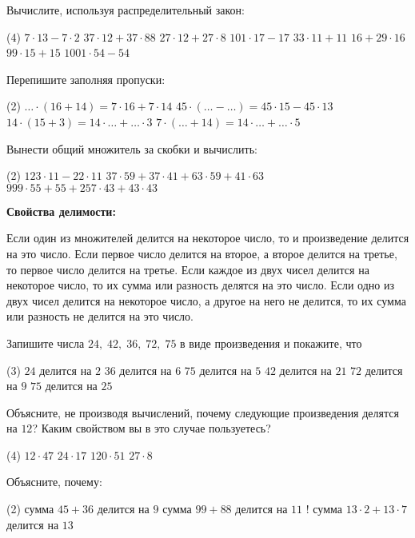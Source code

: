 \begin{class}[number=3]
	\begin{listofex}
	\item Вычислите, используя распределительный закон:
	\begin{tasks}(4)
		\task \( 7\cdot13-7\cdot2 \)
		\task \( 37\cdot12+37\cdot88 \)
		\task \( 27\cdot12+27\cdot8 \)
		\task \( 101\cdot17-17 \)
		\task \( 33\cdot11+11 \)
		\task \( 16+29\cdot16 \)
		\task \( 99\cdot15+15 \)
		\task \( 1001\cdot54-54 \)
	\end{tasks}
	\item Перепишите заполняя пропуски:
	\begin{tasks}(2)
		\task \( {\dots}\cdot(16+14)=7\cdot16+7\cdot14 \)
		\task \( 45\cdot({\dots}-{\dots})=45\cdot15-45\cdot13 \)
		\task \( 14\cdot(15+3)=14\cdot{\dots}+{\dots}\cdot3 \)
		\task \( 7\cdot({\dots}+14)=14\cdot{\dots}+{\dots}\cdot5 \)
	\end{tasks}
	\item Вынести общий множитель за скобки и вычислить:
	\begin{tasks}(2)
		\task \( 123\cdot11-22\cdot11 \)
		\task \( 37\cdot59+37\cdot41+63\cdot59+41\cdot63 \)
		\task \( 999\cdot55+55+257\cdot43+43\cdot43 \)
	\end{tasks}
	\item \textbf{Свойства делимости:}
	\begin{tasks}
		\task Если один из множителей делится на некоторое число, то и произведение делится на это число.
		\task Если первое число делится на второе, а второе делится на третье, то первое число делится на третье.
		\task Если каждое из двух чисел делится на некоторое число, то их сумма или разность делятся на это число.
		\task Если одно из двух чисел делится на некоторое число, а другое на него не делится, то их сумма или разность не делится на это число.
	\end{tasks}
	\item Запишите числа \( 24,\;42,\;36,\;72,\;75 \) в виде произведения и покажите, что
	\begin{tasks}(3)
		\task \( 24 \) делится на \( 2 \)
		\task \( 36 \) делится на \( 6 \)
		\task \( 75 \) делится на \( 5 \)
		\task \( 42 \) делится на \( 21 \)
		\task \( 72 \) делится на \( 9 \)
		\task \( 75 \) делится на \( 25 \)
	\end{tasks}
	\item Объясните, не производя вычислений, почему следующие произведения делятся на \( 12 \)? Каким свойством вы в это случае пользуетесь?
	\begin{tasks}(4)
		\task \( 12\cdot47 \)
		\task \( 24\cdot17 \)
		\task \( 120\cdot51 \)
		\task \( 27\cdot8 \)
	\end{tasks}
	\item Объясните, почему:
	\begin{tasks}(2)
		\task сумма \( 45+36 \) делится на \( 9 \)
		\task сумма \( 99+88 \) делится на \( 11 \)
		\task! сумма \( 13\cdot2+13\cdot7\) делится на \( 13 \)
	\end{tasks}
\end{listofex}
\end{class}



